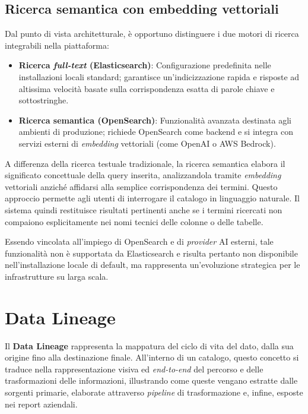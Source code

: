 \subsection{Ricerca semantica con embedding vettoriali}
Dal punto di vista architetturale, è opportuno distinguere i due motori di ricerca integrabili nella piattaforma:
\begin{itemize}
    \item \textbf{Ricerca \emph{full-text} (Elasticsearch)}: Configurazione predefinita nelle installazioni locali standard; garantisce un'indicizzazione rapida e risposte ad altissima velocità basate sulla corrispondenza esatta di parole chiave e sottostringhe.
    \item \textbf{Ricerca semantica (OpenSearch)}: Funzionalità avanzata destinata agli ambienti di produzione; richiede OpenSearch come backend e si integra con servizi esterni di \emph{embedding} vettoriali (come OpenAI o AWS Bedrock).
\end{itemize}

A differenza della ricerca testuale tradizionale, la ricerca semantica elabora il significato concettuale della query inserita, analizzandola tramite \emph{embedding} vettoriali anziché affidarsi alla semplice corrispondenza dei termini. 
Questo approccio permette agli utenti di interrogare il catalogo in linguaggio naturale. 
Il sistema quindi restituisce risultati pertinenti anche se i termini ricercati non compaiono esplicitamente nei nomi tecnici delle colonne o delle tabelle.

Essendo vincolata all'impiego di OpenSearch e di \emph{provider} AI esterni, tale funzionalità non è supportata da Elasticsearch e risulta pertanto non disponibile 
nell'installazione locale di default, ma rappresenta un'evoluzione strategica per le infrastrutture su larga scala.


\section{Data Lineage}
Il \textbf{Data Lineage} rappresenta la mappatura del ciclo di vita del dato, dalla sua origine fino alla destinazione finale. All'interno di un catalogo, 
questo concetto si traduce nella rappresentazione visiva ed \emph{end-to-end} del percorso e delle trasformazioni delle informazioni, 
illustrando come queste vengano estratte dalle sorgenti primarie, elaborate attraverso \emph{pipeline} di trasformazione e, infine, esposte nei report aziendali.

